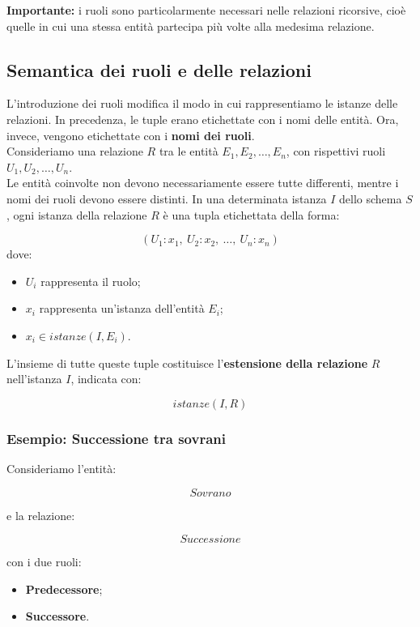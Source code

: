 \noindent
\textbf{Importante:} i ruoli sono particolarmente necessari
nelle relazioni ricorsive, cioè quelle in cui una stessa entità
partecipa più volte alla medesima relazione.

\subsection*{Semantica dei ruoli e delle relazioni}

L'introduzione dei ruoli modifica il modo in cui rappresentiamo
le istanze delle relazioni.
In precedenza, le tuple erano etichettate con i nomi delle entità.
Ora, invece, vengono etichettate con i \textbf{nomi dei ruoli}.\\
Consideriamo una relazione $R$ tra le entità
$E_1,E_2,\ldots,E_n$, con rispettivi ruoli
$U_1,U_2,\ldots,U_n$.\\
Le entità coinvolte non devono necessariamente essere tutte
differenti, mentre i nomi dei ruoli devono essere distinti.
In una determinata istanza $I$ dello schema $S$,
ogni istanza della relazione $R$ è una tupla etichettata
della forma:

\[
(U_1:x_1,\ U_2:x_2,\ \ldots,\ U_n:x_n)
\]
dove:
\begin{itemize}
    \item $U_i$ rappresenta il ruolo;
    \item $x_i$ rappresenta un'istanza dell'entità $E_i$;
    \item $x_i \in istanze(I,E_i)$.
\end{itemize}
\noindent
L'insieme di tutte queste tuple costituisce
l'\textbf{estensione della relazione} $R$ nell'istanza $I$,
indicata con:

\[
istanze(I,R)
\]

\subsubsection*{Esempio: Successione tra sovrani}

Consideriamo l'entità:

\[
Sovrano
\]

e la relazione:

\[
Successione
\]

con i due ruoli:
\begin{itemize}
    \item \textbf{Predecessore};
    \item \textbf{Successore}.
\end{itemize}


